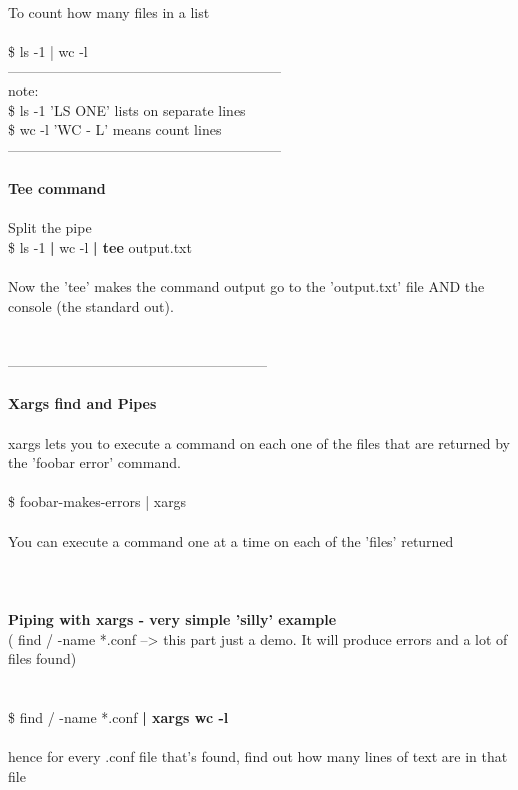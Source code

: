 \documentclass[10pt,a4paper]{article}
\begin{document}
{\\
To count how many files in a list\\
\\
\$ ls -1 | wc -l\\
}{\Large -----------------------------------------------------------\\
note:\\
\$ ls -1     'LS ONE' lists on separate lines\\
\$ wc -l  	'WC - L' means count lines\\
-----------------------------------------------------------\\
\\
\textbf{Tee command}}{\Large \\
\\
Split the pipe\\
\$ ls -1 \textbf{| }}{\Large wc -l \textbf{| tee }}{\Large output.txt\\
\\
Now the 'tee' makes the command output go to the 'output.txt' file AND the console (the standard out).\\
\\
\\
--------------------------------------------------------\\
\\
\textbf{Xargs find and Pipes}}{\Large \\
\\
xargs lets you to execute a command on each one of the files that are returned by the 'foobar error' command. \\
\\
\$ foobar-makes-errors | xargs \\
\\
You can execute a command one at a time on each of the 'files' returned\\
\\
\\
\\
\textbf{Piping with xargs -  very simple 'silly' example}}{\Large \\
( find / -name *.conf  --> this part just a demo. It will produce errors and a lot of files found)\\
\\
\\
\$ }{\large find / -name *.conf }\textbf{{\Large | xargs wc -l}}{\Large \\
\\
hence for every .conf file that's found, find out how many lines of text are in that file\\
}
\end{document}
